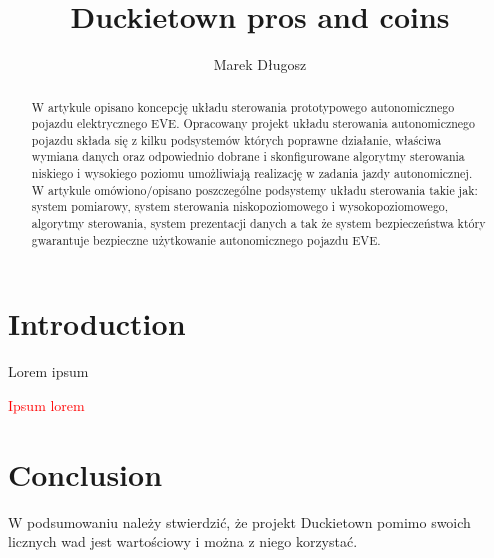 \documentclass{svproc}
\begin{document}
\mainmatter              %
%
\title{Duckietown pros and coins}
%
%
\author{Marek Długosz}
%
%
%

\maketitle              %

\begin{abstract}
W artykule opisano koncepcję układu sterowania prototypowego autonomicznego pojazdu elektrycznego EVE. Opracowany projekt układu sterowania autonomicznego pojazdu składa się z kilku podsystemów których poprawne działanie, właściwa wymiana danych oraz odpowiednio dobrane i skonfigurowane algorytmy sterowania niskiego i wysokiego poziomu umożliwiają realizację w zadania jazdy autonomicznej. W artykule omówiono/opisano poszczególne podsystemy układu sterowania takie jak: system pomiarowy, system sterowania niskopoziomowego i wysokopoziomowego, algorytmy sterowania, system prezentacji danych a tak że system bezpieczeństwa który gwarantuje bezpieczne użytkowanie autonomicznego pojazdu EVE.
\end{abstract}
%
\section{Introduction}
Lorem ipsum

%
\textcolor{red}{
Ipsum lorem}

\section{Conclusion}
W podsumowaniu należy stwierdzić, że projekt Duckietown pomimo swoich licznych wad jest wartościowy i można z niego korzystać.



\end{document}
